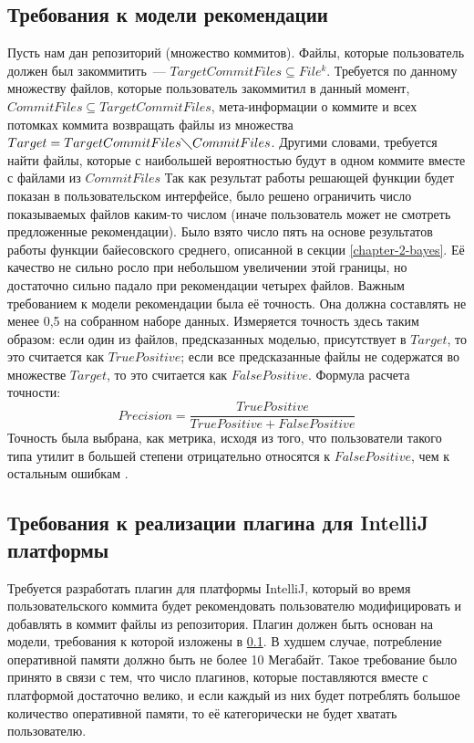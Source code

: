 \subsection{Требования к модели рекомендации}\label{ml-model-req}
Пусть нам дан репозиторий (множество коммитов). Файлы, которые пользователь должен был закоммитить~--- $TargetCommitFiles \subseteq File^k$. Требуется по данному множеству файлов, которые пользователь закоммитил в данный момент, $CommitFiles \subseteq TargetCommitFiles$, мета-информации о коммите и всех потомках коммита возвращать файлы из множества $Target = TargetCommitFiles \diagdown CommitFiles$. Другими словами, требуется найти файлы, которые с наибольшей вероятностью будут в одном коммите вместе с файлами из $CommitFiles$ Так как результат работы решающей функции будет показан в пользовательском интерфейсе, было решено ограничить число показываемых файлов каким-то числом (иначе пользователь может не смотреть предложенные рекомендации). Было взято число пять на основе результатов работы функции байесовского среднего, описанной в секции \ref{chapter-2-bayes}. Её качество не сильно росло при небольшом увеличении этой границы, но достаточно сильно падало при рекомендации четырех файлов. Важным требованием к модели рекомендации была её точность. Она должна составлять не менее 0,5 на собранном наборе данных. Измеряется точность здесь таким образом: если один из файлов, предсказанных моделью, присутствует в $Target$, то это считается как $True Positive$; если все предсказанные файлы не содержатся во множестве $Target$, то это считается как $False Positive$. Формула расчета точности:
    \begin{equation}\label{precision-formula}
        Precision = \frac{True Positive}{True Positive + False Positive}   
    \end{equation}
Точность была выбрана, как метрика, исходя из того, что пользователи такого типа утилит в большей степени отрицательно относятся к $False Positive$, чем к остальным ошибкам \cite{microsoft-false-positive}.
\subsection{Требования к реализации плагина для IntelliJ платформы}\label{impl-req}
Требуется разработать плагин для платформы IntelliJ, который во время пользовательского коммита будет рекомендовать пользователю модифицировать и добавлять в коммит файлы из репозитория. Плагин должен быть основан на модели, требования к которой изложены в \ref{ml-model-req}. В худшем случае, потребление оперативной памяти должно быть не более 10 Мегабайт. Такое требование было принято в связи с тем, что число плагинов, которые поставляются вместе с платформой достаточно велико, и если каждый из них будет потреблять большое количество оперативной памяти, то её категорически не будет хватать пользователю.

